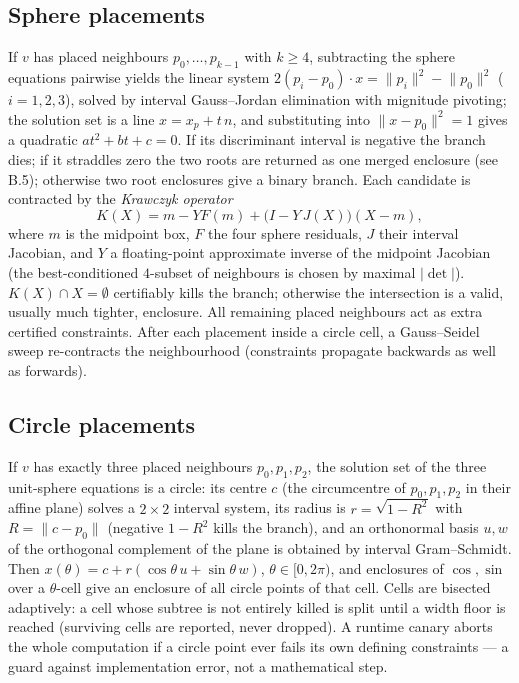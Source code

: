 \documentclass[11pt]{article}
\begin{document}
\subsection{Sphere placements}
If $v$ has placed neighbours $p_0,\dots,p_{k-1}$ with $k\ge4$, subtracting the
sphere equations pairwise yields the linear system
$2(p_i-p_0)\cdot x=\lVert p_i\rVert^2-\lVert p_0\rVert^2$ ($i=1,2,3$), solved
by interval Gauss--Jordan elimination with mignitude pivoting; the solution set
is a line $x=x_p+t\,n$, and substituting into $\lVert x-p_0\rVert^2=1$ gives a
quadratic $at^2+bt+c=0$. If its discriminant interval is negative the branch
dies; if it straddles zero the two roots are returned as one merged enclosure
(see B.5); otherwise two root enclosures give a binary branch. Each candidate
is contracted by the \emph{Krawczyk operator}
\[
K(X)=m-Y F(m)+\bigl(I-Y\,J(X)\bigr)(X-m),
\]
where $m$ is the midpoint box, $F$ the four sphere residuals, $J$ their
interval Jacobian, and $Y$ a floating-point approximate inverse of the midpoint
Jacobian (the best-conditioned $4$-subset of neighbours is chosen by maximal
$|\det|$). $K(X)\cap X=\emptyset$ certifiably kills the branch; otherwise the
intersection is a valid, usually much tighter, enclosure. All remaining placed
neighbours act as extra certified constraints. After each placement inside a
circle cell, a Gauss--Seidel sweep re-contracts the neighbourhood
(constraints propagate backwards as well as forwards).

\subsection{Circle placements}
If $v$ has exactly three placed neighbours $p_0,p_1,p_2$, the solution set of
the three unit-sphere equations is a circle: its centre $c$ (the circumcentre
of $p_0,p_1,p_2$ in their affine plane) solves a $2\times2$ interval system,
its radius is $r=\sqrt{1-R^2}$ with $R=\lVert c-p_0\rVert$ (negative
$1-R^2$ kills the branch), and an orthonormal basis $u,w$ of the orthogonal
complement of the plane is obtained by interval Gram--Schmidt. Then
$x(\theta)=c+r(\cos\theta\,u+\sin\theta\,w)$, $\theta\in[0,2\pi)$, and
enclosures of $\cos,\sin$ over a $\theta$-cell give an enclosure of all circle
points of that cell. Cells are bisected adaptively: a cell whose subtree is not
entirely killed is split until a width floor is reached (surviving cells are
reported, never dropped). A runtime canary aborts the whole computation if a
circle point ever fails its own defining constraints --- a guard against
implementation error, not a mathematical step.
\end{document}
